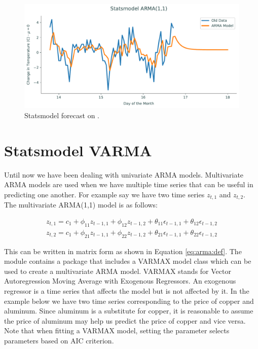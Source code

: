 \begin{figure}[H]
\centering
\includegraphics[width=\textwidth]{figures/sm.pdf}
\caption{Statsmodel forecast on .}
\label{fig:sm}
\end{figure}


\section*{Statsmodel VARMA}
Until now we have been dealing with univariate ARMA models.
Multivariate ARMA models are used when we have multiple time series that can be useful in predicting one another.
For example say we have two time series $z_{t,1}$ and $z_{t,2}$.
The multivariate ARMA(1,1) model is as follows:

\begin{align}
	z_{t,1} = c_1 + \phi_{11} z_{t-1,1} +  \phi_{12} z_{t-1,2} +  \theta_{11} \epsilon_{t-1,1} +  \theta_{12} \epsilon_{t-1,2}
	\\
	z_{t,2} = c_1 + \phi_{21} z_{t-1,1} +  \phi_{22} z_{t-1,2} +  \theta_{21} \epsilon_{t-1,1} +  \theta_{22} \epsilon_{t-1,2}
\end{align}

This can be written in matrix form as shown in Equation \ref{eq:arma:def}.
The module  contains a package that includes a VARMAX model class which can be used to create a multivariate ARMA model.
VARMAX stands for Vector Autoregression Moving Average with Exogenous Regressors. 
An exogenous regressor is a time series that affects the model but is not affected by it.
In the example below we have two time series corresponding to the price of copper and aluminum. 
Since aluminum is a substitute for copper, it is reasonable to assume the price of aluminum may help us predict the price of copper and vice versa.
Note that when fitting a VARMAX model, setting the parameter  selects parameters based on AIC criterion. 

